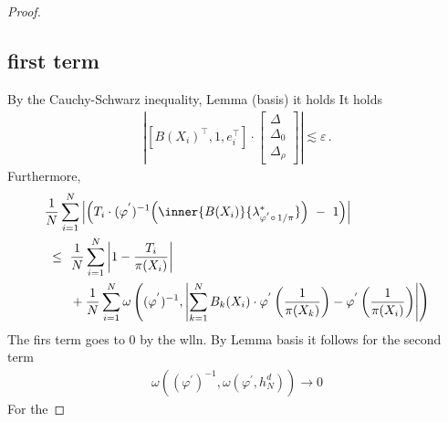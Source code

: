 \begin{proof}
\subsection*{first term}
By the Cauchy-Schwarz inequality, Lemma (basis) it holds
It holds
\begin{align*}
  \left|
   \left[ 
    B(X_i)^\top,1,e_i^\top
  \right]
  \cdot
  \begin{bmatrix}
    \Delta
    \\
    \Delta_0
    \\
    \Delta_\rho
    \end{bmatrix}
  \right|
  \lesssim
  \varepsilon
  \,.
\end{align*}
Furthermore,
\begin{align*}
  &
    \frac{1}{N}
\sum_{i=1} 
  ^N
  \left|
   \left( 
     T_i\cdot
  (
  \varphi^{'}
  )
  ^{-1}
  \!
  \left( 
\inner
{B(X_i)}
{
\lambda^*_{\varphi^{'}\circ\,1/\pi}
}
  \right)
  \ 
  -
  \ 
  1
  \right)
  \right|
  \\
  &
  \ 
  \le
  \ 
    \frac{1}{N}
\sum_{i=1} 
^{N}
\left|
  1-
  \frac
  {T_i}
  {\pi(X_i)}
\right|
\\
&
\qquad
+
    \frac{1}{N}
    \sum_{i=1}^{N} 
\omega
\left(
  (
  \varphi^{'}
  )
  ^{-1}
  ,
  \left|
    \sum_{k=1}^{N}
  B_k(X_i)
  \cdot
  \varphi^{'}
  \left(
    \frac
    {1}
    {\pi(X_k)}
  \right)
  -
  \varphi^{'}
  \left(
    \frac
    {1}
    {\pi(X_i)}
  \right)
  \right|
  \right)
\end{align*}
The firs term goes to 0 by the wlln.
By Lemma basis it follows for the second term
\begin{align*}
\omega
\left(
  (
  \varphi^{'}
  )
  ^{-1}
  ,
  \omega(
  \varphi^{'}
  ,
  h_N^d
  )
  \right)
  \to 0
\end{align*}
For the 
 \end{proof}

